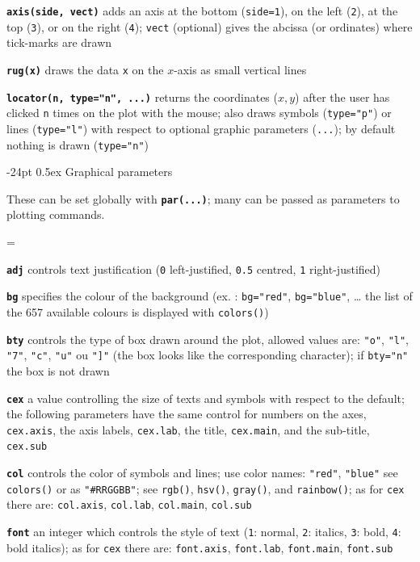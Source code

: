 \documentclass[10pt,landscape]{article}
\makeatletter
\renewcommand\section{\@startsection{section}{1}{0mm}%
                                     {-24pt}%
                                     {0.5ex}%
                                {\color{blue}\normalfont\large\bfseries}}
\newcommand{\code}{\texttt}
\newcommand{\bcode}[1]{\texttt{\textbf{#1}}}
\makeatother
\begin{document}
\begin{multicols}{3}
\bcode{axis(side, vect)}  adds an axis at the bottom (\code{side=1}), on the left (\code{2}), at the top (\code{3}), or on the right (\code{4}); \code{vect} (optional) gives the abcissa (or ordinates) where tick-marks are drawn

\bcode{rug(x)}  draws the data \code{x} on the $x$-axis as small vertical lines

\bcode{locator(n, type="n", ...)}  returns the coordinates ($x,y$) after the user has clicked \code{n} times on the plot with the mouse; also draws symbols (\code{type="p"}) or lines (\code{type="l"}) with respect to optional graphic parameters (\code{...}); by default nothing is drawn (\code{type="n"})




\section{Graphical parameters}

These can be set globally with \bcode{par(...)}; many can be passed as
parameters to plotting commands.

\everypar={\hangindent=9mm}

\bcode{adj}  controls text justification (\code{0} left-justified, \code{0.5} centred, \code{1} right-justified)

\bcode{bg}  specifies the colour of the background (ex. : \code{bg="red"}, \code{bg="blue"}, \ldots{} the list of the 657 available colours is displayed with \code{colors()})

\bcode{bty}  controls the type of box drawn around the plot, allowed values are: \code{"o"}, \code{"l"}, \code{"7"}, \code{"c"}, \code{"u"} ou \code{"]"} (the box looks like the corresponding character); if \code{bty="n"} the box is not drawn

\bcode{cex}  a value controlling the size of texts and symbols with respect to the default; the following parameters have the same control for numbers on the axes, \code{cex.axis}, the axis labels, \code{cex.lab}, the title, \code{cex.main}, and the sub-title, \code{cex.sub}

\bcode{col}  controls the color of symbols and lines; use color names:
\code{"red"}, \code{"blue"} see \code{colors()} or as \code{"\#RRGGBB"};
see \code{rgb()}, \code{hsv()}, \code{gray()}, and \code{rainbow()}; as for \code{cex} there are: \code{col.axis}, \code{col.lab}, \code{col.main}, \code{col.sub}

\bcode{font}  an integer which controls the style of text (\code{1}: normal, \code{2}: italics, \code{3}: bold, \code{4}: bold italics); as for \code{cex} there are: \code{font.axis}, \code{font.lab}, \code{font.main}, \code{font.sub}


\end{multicols}
\end{document}
